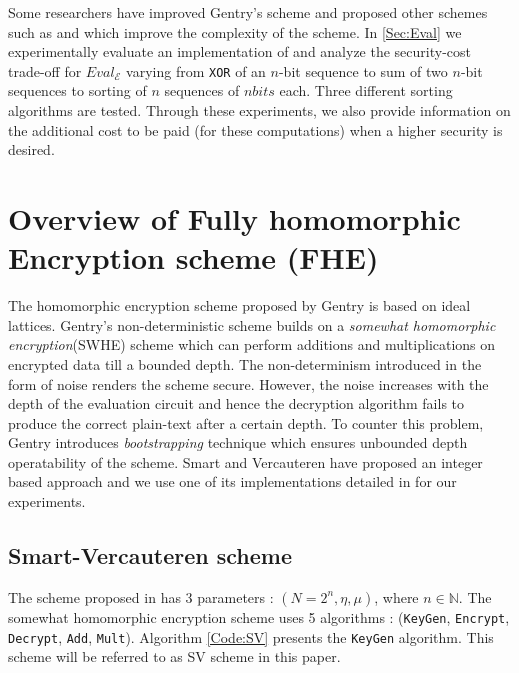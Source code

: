 \documentclass{acm_proc_article-sp}
\begin{document}
Some researchers have improved Gentry's scheme and proposed other schemes such as \cite{cryptoeprint:2009:571} and \cite{cryptoeprint:2011:277} which improve the complexity of the scheme. In \autoref{Sec:Eval} we experimentally evaluate an implementation of  \cite{cryptoeprint:2009:571} and analyze the security-cost trade-off for $Eval_{\mathcal{E}}$ varying from \texttt{XOR} of an $n$-bit sequence to sum of two $n$-bit sequences to sorting of $n$ sequences of $nbits$ each. Three different sorting algorithms are tested.  
Through these experiments, we also provide information on the additional cost to be paid (for these computations) when a higher security is desired.

\section{Overview of Fully homomorphic Encryption scheme (FHE) }

The homomorphic encryption scheme proposed by Gentry \cite{homenc} is based on ideal lattices. Gentry's non-deterministic scheme builds on a \textit{somewhat homomorphic encryption}(SWHE) scheme which can perform additions and multiplications on encrypted data till a bounded depth. The non-determinism introduced in the form of noise renders the scheme secure. However, the noise increases with the depth  of the evaluation circuit and hence the decryption algorithm fails to produce the correct plain-text after a certain depth. To counter this problem, Gentry introduces \textit{bootstrapping} technique which ensures unbounded depth operatability of the scheme. Smart and Vercauteren \cite{cryptoeprint:2009:571} have proposed an integer based approach and we use one of its implementations detailed in \cite{perl:poster} for our experiments.

\subsection{Smart-Vercauteren  scheme}

The scheme proposed in \cite{cryptoeprint:2009:571} has 3 parameters : $(N=2^n, \eta, \mu)$, where $n\in \mathbb{N}$. The somewhat homomorphic encryption scheme uses 5 algorithms : (\texttt{KeyGen}, \texttt{Encrypt}, \texttt{Decrypt}, \texttt{Add}, \texttt{Mult}). Algorithm \autoref{Code:SV} presents the \texttt{KeyGen} algorithm. This scheme will be referred to as SV scheme in this paper.
\end{document}
